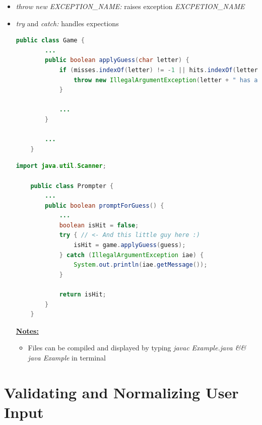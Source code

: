 \documentclass[12pt]{article}
\begin{document}
\begin{itemize}
    \item \textit{throw new EXCEPTION\_NAME:} raises exception \textit{EXCPETION\_NAME}
    \item \textit{try} and \textit{catch:} handles expections

    \begin{lstlisting}[language=Java,caption={lesson\_01/Game.java}]
    public class Game {
        ...
        public boolean applyGuess(char letter) {
            if (misses.indexOf(letter) != -1 || hits.indexOf(letter) != -1) {
                throw new IllegalArgumentException(letter + " has already been guessed"); // <- this little guy here :)
            }

            ...
        }

        ...
    }
    \end{lstlisting}

    \begin{lstlisting}[language=Java,caption={lesson\_01/Prompter.java}]
    import java.util.Scanner;

    public class Prompter {
        ...
        public boolean promptForGuess() {
            ...
            boolean isHit = false;
            try { // <- And this little guy here :)
                isHit = game.applyGuess(guess);
            } catch (IllegalArgumentException iae) {
                System.out.println(iae.getMessage());
            }

            return isHit;
        }
    }
    \end{lstlisting}

    \bigskip

    \underline{\textbf{Notes:}}

    \bigskip

    \begin{itemize}
        \item Files can be compiled and displayed by typing \textit{javac Example.java \&\& java Example}
        in terminal
    \end{itemize}
\end{itemize}

\bigskip

\section{Validating and Normalizing User Input}

\bigskip
\end{document}
